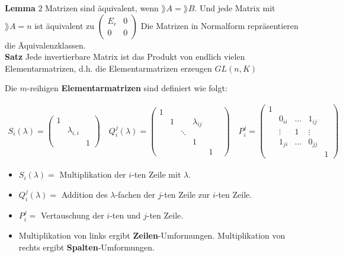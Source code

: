 \textbf{Lemma} $2$ Matrizen sind äquivalent, wenn $\rang A = \rang B$. Und jede Matrix mit $\rang A = n$ ist äquivalent zu $\begin{pmatrix}
    E_r & 0 \\ 0 & 0
\end{pmatrix}$
Die Matrizen in Normalform repräsentieren die Äquivalenzklassen.\\
\textbf{Satz} Jede invertierbare Matrix ist das Produkt von endlich vielen Elementarmatrizen, d.h. die Elementarmatrizen erzeugen $GL(n,K)$\\
\begin{mdframed}
Die $m$-reihigen \textbf{Elementarmatrizen} sind definiert wie folgt:

\begin{align*}
    S_i(\lambda) = \begin{pmatrix}
        1 & &\\
        & \lambda_{i,i} & \\
        & &  1
    \end{pmatrix}
    \quad Q_{i}^{j}(\lambda) = \begin{pmatrix}
        1 & & & &\\
        & 1 & & \lambda_{ij}  & &\\
        & & \ddots &  &\\
        & & & 1 &\\
        & & & & 1
    \end{pmatrix} \quad 
    P_{i}^{j} = \begin{pmatrix}
        1 & & & & \\
        & 0_{ii} & \ldots & 1_{ij} & \\
        & \vdots & 1 & \vdots & \\
        & 1_{ji} & \ldots & 0_{jj} & \\
        & & & & 1
    \end{pmatrix}
\end{align*}
\begin{itemize}
    \item $S_i(\lambda) =$ Multiplikation der $i$-ten Zeile mit $\lambda$.
    
    \item $Q_{i}^{j}(\lambda) =$ Addition des $\lambda$-fachen der $j$-ten Zeile zur $i$-ten Zeile.
    
    \item $P_{i}^{j} =$ Vertauschung der $i$-ten und $j$-ten Zeile.
    
    \item Multiplikation von links ergibt \textbf{Zeilen}-Umformungen. Multiplikation von rechts ergibt \textbf{Spalten}-Umformungen.
\end{itemize}
\end{mdframed}
